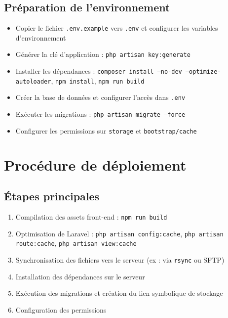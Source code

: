 \documentclass[a4paper,12pt]{report}
\begin{document}
\subsection{Préparation de l’environnement}
\begin{itemize}
  \item Copier le fichier \texttt{.env.example} vers \texttt{.env} et configurer les variables d’environnement
  \item Générer la clé d’application : \texttt{php artisan key:generate}
  \item Installer les dépendances : \texttt{composer install --no-dev --optimize-autoloader}, \texttt{npm install}, \texttt{npm run build}
  \item Créer la base de données et configurer l’accès dans \texttt{.env}
  \item Exécuter les migrations : \texttt{php artisan migrate --force}
  \item Configurer les permissions sur \texttt{storage} et \texttt{bootstrap/cache}
\end{itemize}

\section{Procédure de déploiement}
\subsection{Étapes principales}
\begin{enumerate}
  \item Compilation des assets front-end : \texttt{npm run build}
  \item Optimisation de Laravel : \texttt{php artisan config:cache}, \texttt{php artisan route:cache}, \texttt{php artisan view:cache}
  \item Synchronisation des fichiers vers le serveur (ex : via \texttt{rsync} ou SFTP)
  \item Installation des dépendances sur le serveur
  \item Exécution des migrations et création du lien symbolique de stockage
  \item Configuration des permissions
\end{enumerate}
\end{document}
